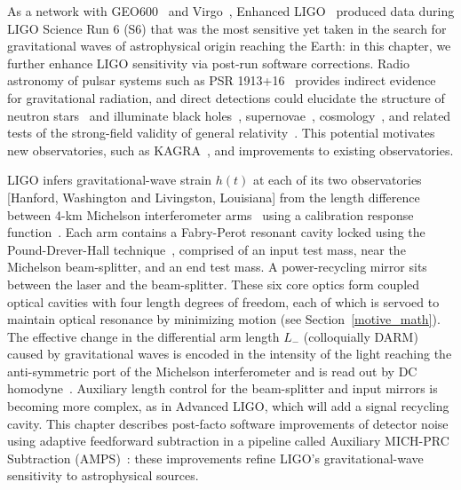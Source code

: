 	As a network with GEO600~\cite{Willke2002,Hild2009} and Virgo~\cite{Acernese2005}, Enhanced LIGO~\cite{LIGOFirst2004,Fricke2009} produced data during LIGO Science Run 6 (S6) that was the most sensitive yet taken in the search for gravitational waves of astrophysical origin reaching the Earth: in this chapter, we further enhance LIGO sensitivity via post-run software corrections. Radio astronomy of pulsar systems such as PSR 1913+16~\cite{HulseTaylor1975,Weisberg2010} provides indirect evidence for gravitational radiation, and direct detections could elucidate the structure of neutron stars~\cite{Lindblom1995,AbbottPulsar2006} and illuminate black holes~\cite{Sathyaprakash2009}, supernovae~\cite{Chandrasekhar1969,Ott2009}, cosmology~\cite{Grishchuk1974}, and related tests of the strong-field validity of general relativity~\cite{Riles2013}. This potential motivates new observatories, such as KAGRA~\cite{Kuroda2010}, and improvements to existing observatories. 

LIGO infers gravitational-wave strain $h(t)$ at each of its two observatories [Hanford, Washington and Livingston, Louisiana] from the length difference between 4-km Michelson interferometer arms~\cite{Saulson} using a calibration response function~\cite{LIGOCal2010}. Each arm contains a Fabry-Perot resonant cavity locked using the Pound-Drever-Hall technique~\cite{Drever1983,Black2001}, comprised of an input test mass, near the Michelson beam-splitter, and an end test mass. A power-recycling mirror sits between the laser and the beam-splitter. These six core optics form coupled optical cavities with four length degrees of freedom, each of which is servoed to maintain optical resonance by minimizing motion (see Section~\ref{motive_math}). The effective change in the differential arm length $L_-$ (colloquially DARM) caused by gravitational waves is encoded in the intensity of the light reaching the anti-symmetric port of the Michelson interferometer and is read out by DC homodyne~\cite{Fricke2009}. Auxiliary length control for the beam-splitter and input mirrors is becoming more complex, as in Advanced LIGO, which will add a signal recycling cavity. This chapter describes post-facto software improvements of detector noise using adaptive feedforward subtraction in a pipeline called Auxiliary MICH-PRC Subtraction (AMPS)~\cite{MatappsRepository}: these improvements refine LIGO's gravitational-wave sensitivity to astrophysical sources.

